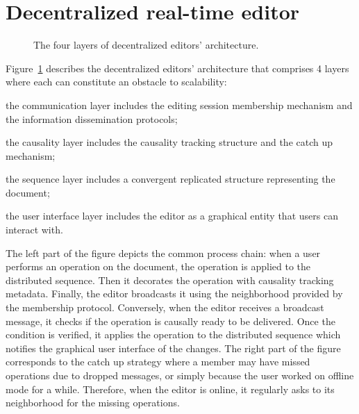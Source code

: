 
\section{Decentralized real-time editor}
\label{sec:editor}



\begin{figure}
  \centering
  
  \caption{\label{fig:architecture}The four layers of decentralized editors'
    architecture.}
\end{figure}


Figure~\ref{fig:architecture} describes the decentralized editors' architecture
that comprises 4 layers where each can constitute an obstacle to scalability:
\begin{inparaenum}[(i)]
\item the communication layer includes the editing session membership mechanism
  and the information dissemination protocols;
\item the causality layer includes the causality tracking structure and the
  catch up mechanism; %
\item the sequence layer includes a convergent replicated structure representing
  the document;
\item the user interface layer includes the editor as a graphical entity that
  users can interact with. %
\end{inparaenum}

The left part of the figure depicts the common process chain: when a user
performs an operation on the document, the operation is applied to the
distributed sequence. Then it decorates the operation with causality tracking
metadata. Finally, the editor broadcasts it using the neighborhood provided by
the membership protocol.  Conversely, when the editor receives a broadcast
message, it checks if the operation is causally ready to be delivered. Once the
condition is verified, it applies the operation to the distributed sequence
which notifies the graphical user interface of the changes.  The right part of
the figure corresponds to the catch up strategy where a member may have missed
operations due to dropped messages, or simply because the user worked on offline
mode for a while. Therefore, when the editor is online, it regularly asks to its
neighborhood for the missing operations.

